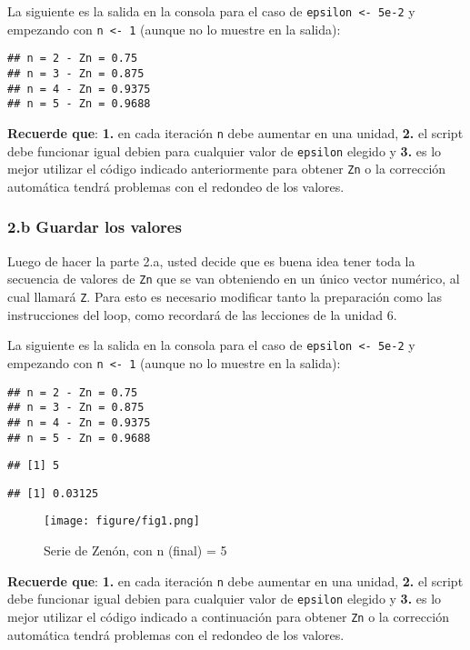 \documentclass[]{article}
\makeatletter
\def\maxwidth{\ifdim\Gin@nat@width>\linewidth\linewidth
\else\Gin@nat@width\fi}
\let\Oldincludegraphics\includegraphics
\renewcommand{\includegraphics}[1]{\Oldincludegraphics[width=\maxwidth]{#1}}
\makeatother
\begin{document}
La siguiente es la salida en la consola para el caso de
\texttt{epsilon \textless{}- 5e-2} y empezando con
\texttt{n \textless{}- 1} (aunque no lo muestre en la salida):

\begin{verbatim}
## n = 2 - Zn = 0.75 
## n = 3 - Zn = 0.875 
## n = 4 - Zn = 0.9375 
## n = 5 - Zn = 0.9688
\end{verbatim}
\textbf{Recuerde que}: \textbf{1.} en cada iteración \texttt{n} debe
aumentar en una unidad, \textbf{2.} el script debe funcionar igual
debien para cualquier valor de \texttt{epsilon} elegido y \textbf{3.} es
lo mejor utilizar el código indicado anteriormente para obtener
\texttt{Zn} o la corrección automática tendrá problemas con el redondeo
de los valores.

\subsubsection{2.b Guardar los valores}

Luego de hacer la parte 2.a, usted decide que es buena idea tener toda
la secuencia de valores de \texttt{Zn} que se van obteniendo en un único
vector numérico, al cual llamará \texttt{Z}. Para esto es necesario
modificar tanto la preparación como las instrucciones del loop, como
recordará de las lecciones de la unidad 6.

La siguiente es la salida en la consola para el caso de
\texttt{epsilon \textless{}- 5e-2} y empezando con
\texttt{n \textless{}- 1} (aunque no lo muestre en la salida):

\begin{verbatim}
## n = 2 - Zn = 0.75 
## n = 3 - Zn = 0.875 
## n = 4 - Zn = 0.9375 
## n = 5 - Zn = 0.9688
\end{verbatim}
\begin{verbatim}
## [1] 5
\end{verbatim}
\begin{verbatim}
## [1] 0.03125
\end{verbatim}
\begin{figure}[htbp]
\centering
\texttt{[image: figure/fig1.png]}
\caption{Serie de Zenón, con n (final) = 5}
\end{figure}

\textbf{Recuerde que}: \textbf{1.} en cada iteración \texttt{n} debe
aumentar en una unidad, \textbf{2.} el script debe funcionar igual
debien para cualquier valor de \texttt{epsilon} elegido y \textbf{3.} es
lo mejor utilizar el código indicado a continuación para obtener
\texttt{Zn} o la corrección automática tendrá problemas con el redondeo
de los valores.
\end{document}
